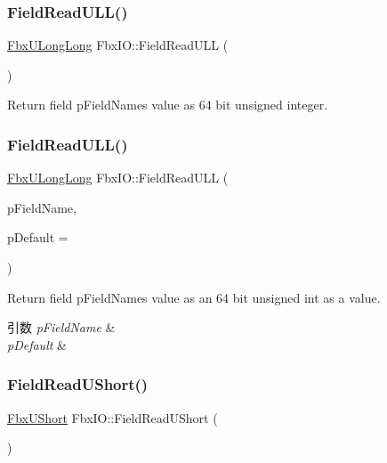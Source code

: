 \subsubsection{\texorpdfstring{Field\+Read\+U\+L\+L()}{FieldReadULL()}\hspace{0.1cm}{\footnotesize\ttfamily [1/2]}}
{\footnotesize\ttfamily \hyperlink{fbxtypes_8h_a267f848573cc1e685aa510be4b1298c8}{Fbx\+U\+Long\+Long} Fbx\+I\+O\+::\+Field\+Read\+U\+LL (\begin{DoxyParamCaption}{ }\end{DoxyParamCaption})}



Return field p\+Field\+Name\textquotesingle{}s value as 64 bit unsigned integer. 

\mbox{\label{class_fbx_i_o_a92c6633cb6e20ef5172f3a0f5d05a2d0}} 
\subsubsection{\texorpdfstring{Field\+Read\+U\+L\+L()}{FieldReadULL()}\hspace{0.1cm}{\footnotesize\ttfamily [2/2]}}
{\footnotesize\ttfamily \hyperlink{fbxtypes_8h_a267f848573cc1e685aa510be4b1298c8}{Fbx\+U\+Long\+Long} Fbx\+I\+O\+::\+Field\+Read\+U\+LL (\begin{DoxyParamCaption}\item[{const char $\ast$}]{p\+Field\+Name,  }\item[{\hyperlink{fbxtypes_8h_a267f848573cc1e685aa510be4b1298c8}{Fbx\+U\+Long\+Long}}]{p\+Default = {} }\end{DoxyParamCaption})}

Return field p\+Field\+Name\textquotesingle{}s value as an 64 bit unsigned int as a value. 
\begin{DoxyParams}{引数}
{\em p\+Field\+Name} & \\
\hline
{\em p\+Default} & \\
\hline
\end{DoxyParams}
\mbox{\label{class_fbx_i_o_a660e2929fc00fa522be7f6c695df2337}} 
\subsubsection{\texorpdfstring{Field\+Read\+U\+Short()}{FieldReadUShort()}\hspace{0.1cm}{\footnotesize\ttfamily [1/2]}}
{\footnotesize\ttfamily \hyperlink{fbxtypes_8h_a321ef060885fc068fd77ac69a49f51d9}{Fbx\+U\+Short} Fbx\+I\+O\+::\+Field\+Read\+U\+Short (\begin{DoxyParamCaption}{ }\end{DoxyParamCaption})}



